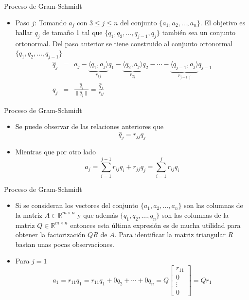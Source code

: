 \documentclass{beamer}
\begin{document}
 \begin{frame}{Proceso de Gram-Schmidt}
  \begin{itemize}
   \item Paso $j$: Tomando $a_j$ con $3\leq j \leq n$ del conjunto $\{a_1,a_2,\ldots,a_n\}$. El objetivo es hallar $q_j$ de tama\~no 1 tal que $\{q_1,q_2,\ldots,q_{j-1},q_j\}$ tambi\'en sea un conjunto ortonormal.  Del paso anterior se tiene construido al conjunto ortonormal $\{q_1,q_2,\ldots,q_{j-1}\}$
   \begin{eqnarray}
   \nonumber \hat q_j &=& a_j - \underbrace{\langle q_1,a_j\rangle}_{r_{1j}}q_1 - \underbrace{\langle q_2,a_j\rangle}_{r_{2j}}q_2 - \cdots - \underbrace{\langle q_{j-1},a_j\rangle}_{r_{j-1,j}}q_{j-1} \\
   \nonumber q_j &=& \frac{\hat q_j}{\|\hat q_j\|} = \frac{\hat q_j}{r_{jj}}
   \end{eqnarray}
  \end{itemize}
 \end{frame}
 \begin{frame}{Proceso de Gram-Schmidt}
  \begin{itemize}
   \item Se puede observar de las relaciones anteriores que
   $$
   \hat q_j = r_{jj}q_j
   $$
   \item<2-> Mientras que por otro lado
   $$
   a_j = \sum_{i=1}^{j-1}r_{ij}q_i + r_{jj}q_j = \sum_{i=1}^{j}r_{ij}q_i
   $$
  \end{itemize}
 \end{frame}
 \begin{frame}{Proceso de Gram-Schmidt}
 \begin{itemize}
  \item Si se consideran los vectores del conjunto $\{a_1,a_2,\ldots,a_n\}$ son las columnas de la matriz $A\in \mathbb{R}^{m\times n}$ y que adem\'as $\{q_1,q_2,\ldots,q_n\}$ son las columnas de la matriz $Q\in \mathbb{R}^{m \times n}$ entonces esta \'ultima expresi\'on es de mucha utilidad para obtener la factorizaci\'on $QR$ de $A$. Para identificar la matriz triangular $R$ bastan unas pocas observaciones.
  \item<2-> Para $j=1$
  $$
  a_1 = r_{11}q_1 = r_{11}q_1 + 0q_2 + \cdots + 0q_n = Q\left[\begin{array}{c}
                                                               r_{11}\\
                                                               0\\
                                                               \vdots\\
                                                               0
                                                              \end{array}\right] = Qr_1
  $$
 \end{itemize}
 \end{frame}
\end{document}
